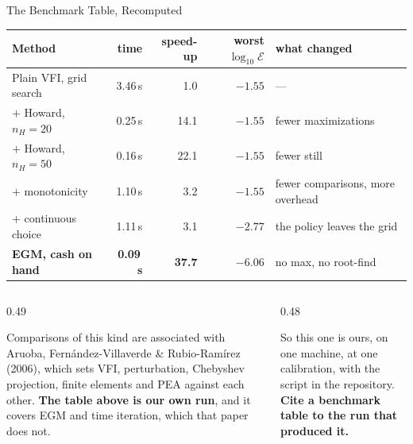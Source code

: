 \begin{frame}{The Benchmark Table, Recomputed}
\renewcommand{\arraystretch}{1.15}
\begin{center}\scriptsize
\begin{tabularx}{\linewidth}{@{}>{\raggedright\arraybackslash}p{3.4cm} r r r >{\raggedright\arraybackslash}X@{}}
\toprule
\textbf{Method} & \textbf{time} & \textbf{speed-up} & \textbf{worst $\log_{10}\mathcal{E}$} & \textbf{what changed} \\
\midrule
Plain VFI, grid search & 3.46\,s & 1.0 & $-1.55$ & --- \\
$+$ Howard, $n_H=20$ & 0.25\,s & 14.1 & $-1.55$ & fewer maximizations \\
$+$ Howard, $n_H=50$ & 0.16\,s & 22.1 & $-1.55$ & fewer still \\
$+$ monotonicity & 1.10\,s & 3.2 & $-1.55$ & fewer comparisons, more overhead \\
$+$ continuous choice & 1.11\,s & 3.1 & $-2.77$ & the policy leaves the grid \\
\textbf{EGM, cash on hand} & \textbf{0.09\,s} & \textbf{37.7} & $\mathbf{-6.06}$ & no max, no root-find \\
\bottomrule
\end{tabularx}
\end{center}
\vspace{1mm}
\begin{columns}[T]
\begin{column}{0.49\textwidth}
\begin{cautionbox}\footnotesize
Comparisons of this kind are associated with Aruoba, Fern\'andez-Villaverde \& Rubio-Ram\'irez (2006), which sets VFI, perturbation, Chebyshev projection, finite elements and PEA against each other. \textbf{The table above is our own run}, and it covers EGM and time iteration, which that paper does not.
\end{cautionbox}
\end{column}
\begin{column}{0.48\textwidth}
\begin{takeawaybox}\footnotesize
So this one is ours, on one machine, at one calibration, with the script in the repository. \textbf{Cite a benchmark table to the run that produced it.}
\end{takeawaybox}
\end{column}
\end{columns}
\end{frame}

